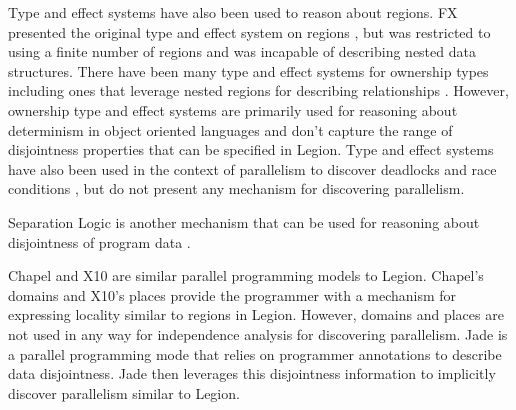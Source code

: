 Type and effect systems have also been used to reason about regions.  FX presented
the original type and effect system on regions \cite{Lucassen88}, but was restricted 
to using a finite number of regions and was incapable of describing nested data
structures.  There have been many type and effect systems for ownership types
\cite{Boyapati03} including ones that leverage nested regions for describing
relationships \cite{Clarke02,Cameron07}.  However, ownership type and effect systems
are primarily used for reasoning about determinism in object oriented languages and
don't capture the range of disjointness properties that can be specified in Legion.
Type and effect systems have also been used in the context of parallelism to discover
deadlocks and race conditions \cite{Boyapati02,Abadi06,Jacobs08}, but do not present 
any mechanism for discovering parallelism.

Separation Logic is another mechanism that can be used for reasoning about disjointness
of program data \cite{Reynolds02}. %

Chapel\cite{Chamberlain:Chapel} and X10 \cite{X1005} are similar parallel programming
models to Legion.  Chapel's domains and X10's places provide the programmer with a 
mechanism for expressing locality similar to regions in Legion.  However, domains
and places are not used in any way for independence analysis for discovering parallelism.
Jade is a parallel programming mode that relies on programmer annotations to describe
data disjointness\cite{Rinard98}.  Jade then leverages this disjointness information
to implicitly discover parallelism similar to Legion.
